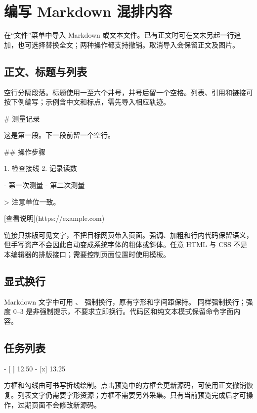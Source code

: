 \chapter{编写 Markdown 混排内容}\label{ch:markdown}
在“文件”菜单中导入 Markdown 或文本文件。已有正文时可在文末另起一行追加，也可选择替换全文；两种操作都支持撤销。取消导入会保留正文及图片。
\section{正文、标题与列表}
空行分隔段落。标题使用一至六个井号，井号后留一个空格。列表、引用和链接可按下例编写；示例含中文和标点，需先导入相应轨迹。
\par\noindent\begin{minipage}{\linewidth}
\begin{Source}
# 测量记录

这是第一段。下一段前留一个空行。

## 操作步骤

1. 检查接线
2. 记录读数

- 第一次测量
- 第二次测量

> 注意单位一致。

[查看说明](https://example.com)
\end{Source}
\end{minipage}\par\medskip

链接只排版可见文字，不把目标网页带入页面。强调、加粗和行内代码保留语义，但手写资产不会因此自动变成系统字体的粗体或斜体。任意 HTML 与 CSS 不是本编辑器的排版接口；需要控制页面位置时使用模板。

\section{显式换行}
Markdown 文字中可用 \code{\newline}、\code{\linebreak} 强制换行，原有字形和字间距保持。\code{\linebreak[4]} 同样强制换行；强度 0--3 是非强制提示，不要求立即换行。代码区和纯文本模式保留命令字面内容。

\section{任务列表}
\par\noindent\begin{minipage}{\linewidth}
\begin{Source}
- [ ] 12.50
- [x] 13.25
\end{Source}
\end{minipage}\par\medskip
方框和勾线由可书写折线绘制。点击预览中的方框会更新源码，可使用正文撤销恢复。列表文字仍需要字形资源；方框不需要另外采集。只有当前预览完成后才可操作，过期页面不会修改新源码。

